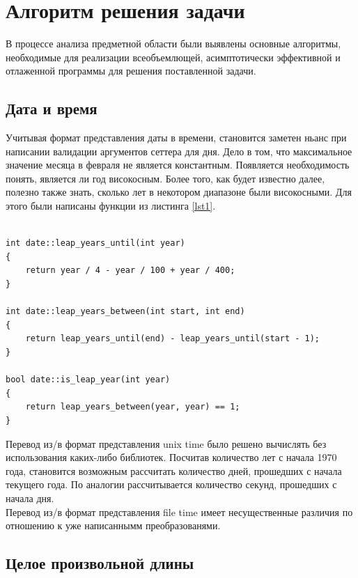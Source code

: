 \documentclass[a4paper,12pt]{article}
\begin{document}
\cleardoublepage

\section{Алгоритм решения задачи}

В процессе анализа предметной области были выявлены основные алгоритмы, необходимые для реализации всеобъемлющей, асимптотически эффективной и отлаженной программы для решения поставленной задачи.

\subsection{Дата и время}

Учитывая формат представления даты в времени, становится заметен ньанс при написании валидации аргументов сеттера для дня.
Дело в том, что максимальное значение месяца в февраля не является константным.
Появляется необходимость понять, является ли год високосным.
Более того, как будет известно далее, полезно также знать, сколько лет в некотором диапазоне были високосными.
Для этого были написаны функции из листинга \ref{lst1}.

\begin{lstlisting}[caption={Функции для работы с високосными годами},captionpos=b,label=lst1]

int date::leap_years_until(int year)
{
	return year / 4 - year / 100 + year / 400;
}

int date::leap_years_between(int start, int end)
{
	return leap_years_until(end) - leap_years_until(start - 1);
}

bool date::is_leap_year(int year)
{
	return leap_years_between(year, year) == 1;
}

\end{lstlisting}

Перевод из/в формат представления unix time было решено вычислять без использования каких-либо библиотек.
Посчитав количество лет с начала 1970 года, становится возможным рассчитать количество дней, прошедших с начала текущего года.
По аналогии рассчитывается количество секунд, прошедших с начала дня.\\


Перевод из/в формат представления file time имеет несущественные различия по отношению к уже написаннымм преобразованями.

\subsection{Целое произвольной длины}
\end{document}
